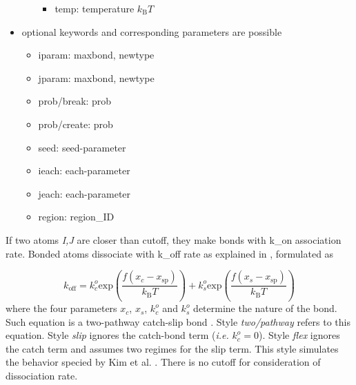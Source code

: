 \begin{itemize}
\begin{itemize}
\begin{itemize}
      \item temp: temperature $k_{\text{B}}T$

    \end{itemize}

  \end{itemize}

  \item optional keywords and corresponding parameters are possible

  \begin{itemize}

    \item iparam: maxbond, newtype

    \item jparam: maxbond, newtype

    \item prob/break: prob

    \item prob/create: prob

    \item seed: seed-parameter

    \item ieach: each-parameter

    \item jeach: each-parameter
    
    \item region: region\_ID

  \end{itemize}



\end{itemize}



If two atoms \textit{I,J} are closer than cutoff, they make bonds with k\_on association rate. Bonded atoms dissociate with k\_off rate as explained in \cite{Pereverzev2005a,Prezhdo2009a}, formulated as

  \begin{equation}
    k_\text{off} = k^o_c\text{exp}(\frac{f(x_c-x_\text{sp})}{k_\text{B}T}) + k^o_s\text{exp}(\frac{f(x_s-x_\text{sp})}{k_\text{B}T})
  \end{equation} where the four parameters $x_c$, $x_s$, $k^o_c$ and $k^o_s$ determine the nature of the bond. Such equation is a two-pathway catch-slip bond \cite{Pereverzev2005a}. Style \emph{two/pathway} refers to this equation. Style \emph{slip} ignores the catch-bond term (\emph{i.e.} $k^o_c = 0$). Style \emph{flex} ignores the catch term and assumes two regimes for the slip term. This style simulates the behavior specied by Kim et al. \cite{Kim2010a}. There is no cutoff for consideration of dissociation rate.
  
